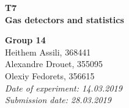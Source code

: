 


	
\begin{titlepage}
	\thispagestyle{empty}
	
%
%
%
	
	\hspace{0pt}
	\vspace{2cm}
	\begin{center}
		\hdashrule{\linewidth}{1pt}{}
		\vskip -0.5cm
		\hdashrule{\linewidth}{0.5pt}{}
		
		\vspace{0.5cm}
		\Huge{ \textbf{ T7 \\}}
		\LARGE{ \textbf{Gas detectors and statistics} } 
		
		\hdashrule{\linewidth}{0.5pt}{}
		\vskip -0.95cm
		\hdashrule{\linewidth}{1pt}{}
		
		\vspace{3cm}
		\Large{\textbf{ Group 14 \\}}
		\Large{Heithem Assili, 368441 \\ Alexandre Drouet, 355095 \\ Olexiy Fedorets, 356615 \\}
		\vspace{1cm}
		\Large{\textsl{ Date of experiment: 14.03.2019 \\ Submission date: 28.03.2019}}
		
	\end{center}
	\vfill
	
\end{titlepage}
	
	
	
{}
\thispagestyle{plain}

